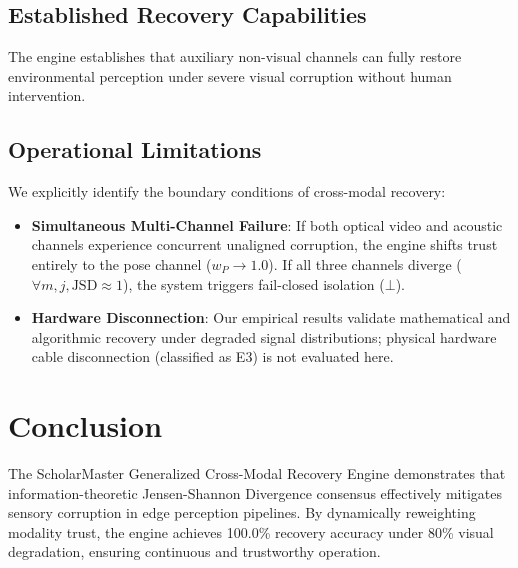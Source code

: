 \documentclass[10pt,journal,compsoc]{IEEEtran}
\begin{document}
\subsection{Established Recovery Capabilities}
The engine establishes that auxiliary non-visual channels can fully restore environmental perception under severe visual corruption without human intervention.

\subsection{Operational Limitations}
We explicitly identify the boundary conditions of cross-modal recovery:
\begin{itemize}
    \item \textbf{Simultaneous Multi-Channel Failure}: If both optical video and acoustic channels experience concurrent unaligned corruption, the engine shifts trust entirely to the pose channel ($w_P \to 1.0$). If all three channels diverge ($\forall m, j, \text{JSD} \approx 1$), the system triggers fail-closed isolation ($\bot$).
    \item \textbf{Hardware Disconnection}: Our empirical results validate mathematical and algorithmic recovery under degraded signal distributions; physical hardware cable disconnection (classified as E3) is not evaluated here.
\end{itemize}

\section{Conclusion}
The ScholarMaster Generalized Cross-Modal Recovery Engine demonstrates that information-theoretic Jensen-Shannon Divergence consensus effectively mitigates sensory corruption in edge perception pipelines. By dynamically reweighting modality trust, the engine achieves 100.0\% recovery accuracy under 80\% visual degradation, ensuring continuous and trustworthy operation.
\end{document}
